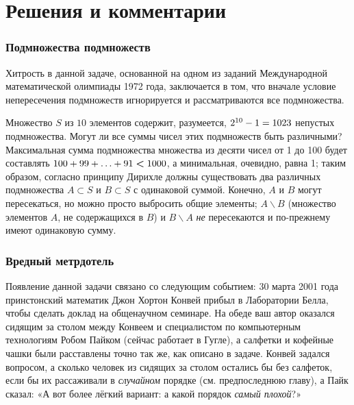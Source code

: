 \documentclass[twoside]{book}
\begin{document}

\section*{Решения и комментарии}

\subsubsection*{Подмножества подмножеств}%

Хитрость в данной задаче, основанной на одном из заданий Международной математической олимпиады 1972 года, заключается в том, что вначале условие непересечения подмножеств игнорируется и рассматриваются все подмножества.

\medskip

Множество $S$ из $10$ элементов содержит, разумеется, $2^{10} - 1 \z= 1023$ непустых подмножества.
Могут ли все суммы чисел этих подмножеств быть различными?
Максимальная сумма подмножества множества из десяти чисел от 1 до 100 будет составлять 
$100+99+\ldots+91\hm<1000$, а минимальная, очевидно, равна 1; таким образом, согласно принципу Дирихле должны существовать два различных подмножества $A\subset S$ и $B\subset S$ 
с одинаковой суммой.
Конечно, $A$ и $B$ могут пересекаться, но можно просто выбросить общие элементы;
$A\backslash B$ (множество элементов $A$, не содержащихся в $B$) и $B\backslash A$ \emph{не} пересекаются и по-прежнему имеют одинаковую сумму.\heart

\subsubsection*{Вредный метрдотель}%

Появление данной задачи связано со следующим событием:
30 марта 2001 года принстонский математик Джон Хортон Конвей %
прибыл в Лаборатории Белла, %
чтобы сделать доклад на общенаучном семинаре. %
На обеде ваш автор оказался сидящим за столом между Конвеем и специалистом по компьютерным технологиям Робом Пайком %
(сейчас работает в Гугле), а салфетки и кофейные чашки были расставлены точно так же, как описано в задаче.
Конвей задался вопросом, а сколько человек из
сидящих за столом остались бы без салфеток, если бы их рассаживали в \emph{случайном} порядке (см. предпоследнюю главу), а Пайк сказал: «А вот более лёгкий вариант: а какой порядок \emph{самый плохой}?»
\end{document}

